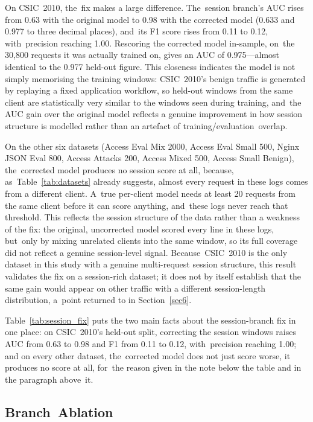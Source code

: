 \documentclass[futureinternet,article,accept,moreauthors]{Definitions/mdpi}
\begin{document}
On CSIC~2010, the~fix makes a large difference. The~session branch's AUC rises from 0.63 with the original model to 0.98 with the corrected model (0.633 and 0.977 to three decimal places), and~its F1 score rises from 0.11 to 0.12, with~precision reaching 1.00. Rescoring the corrected model in-sample, on~the 30{,}800 requests it was actually trained on, gives an AUC of 0.975---almost identical to the 0.977 held-out figure. This closeness indicates the model is not simply memorising the training windows: CSIC~2010's benign traffic is generated by replaying a fixed application workflow, so held-out windows from the same client are statistically very similar to the windows seen during training, and~the AUC gain over the original model reflects a genuine improvement in how session structure is modelled rather than an artefact of training/evaluation~overlap.

On the other six datasets (Access Eval Mix 2000, Access Eval Small 500, Nginx JSON Eval 800, Access Attacks 200, Access Mixed 500, Access Small Benign), the~corrected model produces no session score at all, because, as~Table~\ref{tab:datasets} already suggests, almost every request in these logs comes from a different client. A~true per-client model needs at least 20 requests from the same client before it can score anything, and~these logs never reach that threshold. This reflects the session structure of the data rather than a weakness of the fix: the original, uncorrected model scored every line in these logs, but~only by mixing unrelated clients into the same window, so its full coverage did not reflect a genuine session-level signal. Because~CSIC~2010 is the only dataset in this study with a genuine multi-request session structure, this result validates the fix on a session-rich dataset; it does not by itself establish that the same gain would appear on other traffic with a different session-length distribution, a~point returned to in Section~\ref{sec6}.



Table~\ref{tab:session_fix} puts the two main facts about the session-branch fix in one place: on CSIC~2010's held-out split, correcting the session windows raises AUC from 0.63 to 0.98 and F1 from 0.11 to 0.12, with~precision reaching 1.00; and on every other dataset, the~corrected model does not just score worse, it produces no score at all, for~the reason given in the note below the table and in the paragraph above~it.



\subsection{Branch~Ablation}
\end{document}
